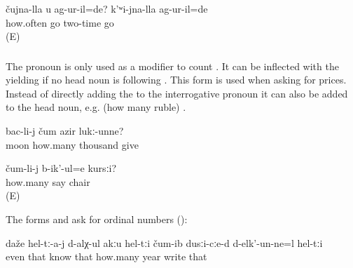 \begin{exe}
	\ex	\label{ex:At which time did you go? I went at the second time.}
	\gll	čujna-lla	u	ag-ur-il=de?	k'ʷi-jna-lla	ag-ur-il=de\\
		how.often		go	two-time	go\\
	\glt	{} (E)
\end{exe}



\subsubsection{ }
\label{sssec:cum how many}

The pronoun   is only used as a modifier to count . It can be inflected with the  yielding  if no head noun is following . This form is used when asking for prices. Instead of directly adding the  to the interrogative pronoun it can also be added to the head noun, e.g.  (how many ruble) .

\begin{exe}
	\ex	\label{ex:How many thousand (of rubles) does (the government) give per month (as child allowance)?}
	\gll	bac-li-j	čum	azir	lukː-unne?\\
		moon	how.many	thousand	give\\
	\glt	{}

	\ex	\label{ex:How much does the chair cost?}
	\gll	čum-li-j	b-ik'-ul=e	kursːi?\\
		how.many	say	chair\\
	\glt	{} (E)
\end{exe}

The forms  and  ask for ordinal numbers ():

\begin{exe}
	\ex	\label{ex:Even they do not remember in which year (the pictures) were drawn}
	\gll	daže	hel-tː-a-j d-alχ-ul akːu	hel-tːi	čum-ib	dusːi-cːe-d d-elk'-un-ne=l	hel-tːi\\
		even	that	know		that		how.many	year	write	that\\
	\glt	{}
\end{exe}


